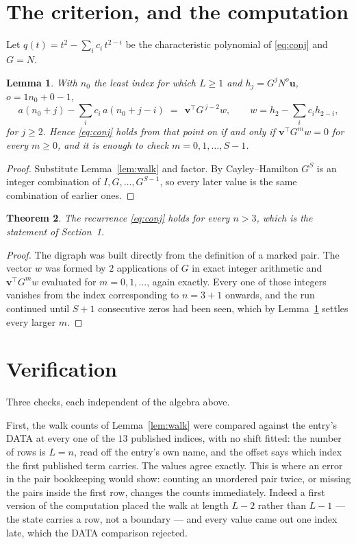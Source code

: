 \documentclass[11pt,a4paper]{article}
\theoremstyle{plain}
\newtheorem{theorem}{Theorem}
\newtheorem{lemma}[theorem]{Lemma}
\theoremstyle{definition}
\begin{document}
\section{The criterion, and the computation}

Let $q(t)=t^{2}-\sum_i c_i\,t^{2-i}$ be the characteristic polynomial of
\eqref{eq:conj} and $G=N$.

\begin{lemma}\label{lem:crit}
With $n_0$ the least index for which $L\ge1$ and $h_j=G^{j}N^{o}\mathbf{u}$,
$o=1n_0+0-1$,
\[
a(n_0+j)-\sum_i c_i\,a(n_0+j-i)\;=\;\,\mathbf{v}^{\!\top}G^{\,j-2}w,
\qquad w=h_{2}-\sum_i c_i h_{2-i},
\]
for $j\ge2$. Hence \eqref{eq:conj} holds from that point on if and only if
$\mathbf{v}^{\!\top}G^{m}w=0$ for every $m\ge0$, and it is enough to check
$m=0,1,\dots,S-1$.
\end{lemma}

\begin{proof}
Substitute Lemma~\ref{lem:walk} and factor. By Cayley--Hamilton $G^{S}$ is an integer
combination of $I,G,\dots,G^{S-1}$, so every later value is the same combination of earlier
ones.
\end{proof}

\begin{theorem}
The recurrence \eqref{eq:conj} holds for every $n>3$, which is the statement of
Section~1.
\end{theorem}

\begin{proof}
The digraph was built directly from the definition of a marked pair. The vector $w$ was
formed by $2$ applications of $G$ in exact integer arithmetic and
$\mathbf{v}^{\!\top}G^{m}w$ evaluated for $m=0,1,\dots$, again exactly. Every one of
those integers vanishes from the index corresponding to $n=3+1$ onwards, and the run
continued until $S+1$ consecutive zeros had been seen, which by Lemma~\ref{lem:crit}
settles every larger $m$.
\end{proof}

\section{Verification}

Three checks, each independent of the algebra above.

First, the walk counts of Lemma~\ref{lem:walk} were compared against the entry's DATA at
every one of the $13$ published indices, with no shift fitted: the number of rows is
$L=n$, read off the entry's own name, and the offset says which index the first
published term carries. The values agree exactly. This is where an error in the pair
bookkeeping would show: counting an unordered pair twice, or missing the pairs inside the
first row, changes the counts immediately. Indeed a first version of the computation
placed the walk at length $L-2$ rather than $L-1$ --- the state carries a row, not a
boundary --- and every value came out one index late, which the DATA comparison rejected.
\end{document}
